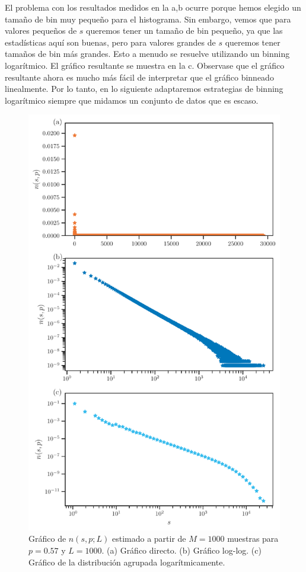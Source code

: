 El problema con los resultados medidos en la  a,b ocurre porque hemos elegido un tamaño de bin muy pequeño para el histograma. Sin embargo, vemos que para valores pequeños de $s$ queremos tener un tamaño de bin pequeño, ya que las estadísticas aquí son buenas, pero para valores grandes de $s$ queremos tener tamaños de bin más grandes. Esto a menudo se resuelve utilizando un binning logarítmico.  El gráfico resultante  se muestra en la c. Observase que el gráfico resultante ahora es mucho más fácil de interpretar que el gráfico binneado linealmente.  Por lo tanto, en lo siguiente adaptaremos estrategias de binning logarítmico siempre que midamos un conjunto de datos que es escaso.



\begin{figure}[h!]
	\centering{}\includegraphics[width=\imsize]{num_clusteres_red_cuadrada.pdf}
	\caption[Gráfico de $n(s, p; L)$ estimado a partir de $M = 1000$ muestras para  $p=0.57$ y $L = 1000$.]{Gráfico de $n(s, p; L)$ estimado a partir de $M = 1000$ muestras para $p=0.57$ y $L = 1000$. (a) Gráfico directo. (b) Gráfico log-log. (c) Gráfico de la distribución agrupada logarítmicamente.}\label{f:num_clusteres_red_cuadrada}  
\end{figure}


